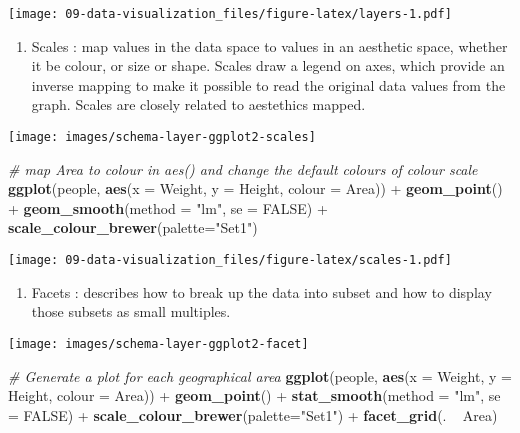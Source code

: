 \documentclass[]{book}
\newenvironment{Shaded}{\begin{snugshade}}{\end{snugshade}}
\newcommand{\KeywordTok}[1]{\textcolor[rgb]{0.13,0.29,0.53}{\textbf{{#1}}}}
\newcommand{\DataTypeTok}[1]{\textcolor[rgb]{0.13,0.29,0.53}{{#1}}}
\newcommand{\StringTok}[1]{\textcolor[rgb]{0.31,0.60,0.02}{{#1}}}
\newcommand{\CommentTok}[1]{\textcolor[rgb]{0.56,0.35,0.01}{\textit{{#1}}}}
\newcommand{\OtherTok}[1]{\textcolor[rgb]{0.56,0.35,0.01}{{#1}}}
\newcommand{\NormalTok}[1]{{#1}}
\providecommand{\tightlist}{%
  \setlength{\itemsep}{0pt}\setlength{\parskip}{0pt}}
\def\tightlist{}
\begin{document}
\texttt{[image: 09-data-visualization\_files/figure-latex/layers-1.pdf]}

\begin{enumerate}
\def\labelenumi{\arabic{enumi}.}
\setcounter{enumi}{3}
\tightlist
\item
   {Scales} : map values in the data space to values in an aesthetic
  space, whether it be colour, or size or shape. Scales draw a legend on
  axes, which provide an inverse mapping to make it possible to read the
  original data values from the graph. Scales are closely related to
  aestethics mapped.
\end{enumerate}

\texttt{[image: images/schema-layer-ggplot2-scales]}

\begin{Shaded}
\begin{Highlighting}[]
\CommentTok{# map Area to colour in aes() and change the default colours of colour scale  }
\KeywordTok{ggplot}\NormalTok{(people, }\KeywordTok{aes}\NormalTok{(}\DataTypeTok{x =} \NormalTok{Weight, }\DataTypeTok{y =} \NormalTok{Height, }\DataTypeTok{colour =} \NormalTok{Area)) +}
\StringTok{  }\KeywordTok{geom_point}\NormalTok{() +}
\StringTok{  }\KeywordTok{geom_smooth}\NormalTok{(}\DataTypeTok{method =} \StringTok{"lm"}\NormalTok{, }\DataTypeTok{se =} \OtherTok{FALSE}\NormalTok{) +}
\StringTok{  }\KeywordTok{scale_colour_brewer}\NormalTok{(}\DataTypeTok{palette=}\StringTok{"Set1"}\NormalTok{)}
\end{Highlighting}
\end{Shaded}

\texttt{[image: 09-data-visualization\_files/figure-latex/scales-1.pdf]}

\begin{enumerate}
\def\labelenumi{\arabic{enumi}.}
\setcounter{enumi}{4}
\tightlist
\item
   {Facets} : describes how to break up the data into subset and how to
  display those subsets as small multiples.
\end{enumerate}

\texttt{[image: images/schema-layer-ggplot2-facet]}

\begin{Shaded}
\begin{Highlighting}[]
\CommentTok{# Generate a plot for each geographical area}
\KeywordTok{ggplot}\NormalTok{(people, }\KeywordTok{aes}\NormalTok{(}\DataTypeTok{x =} \NormalTok{Weight, }\DataTypeTok{y =} \NormalTok{Height, }\DataTypeTok{colour =} \NormalTok{Area)) +}
\StringTok{  }\KeywordTok{geom_point}\NormalTok{() +}
\StringTok{  }\KeywordTok{stat_smooth}\NormalTok{(}\DataTypeTok{method =} \StringTok{"lm"}\NormalTok{, }\DataTypeTok{se =} \OtherTok{FALSE}\NormalTok{) +}\StringTok{ }
\StringTok{  }\KeywordTok{scale_colour_brewer}\NormalTok{(}\DataTypeTok{palette=}\StringTok{"Set1"}\NormalTok{) +}
\StringTok{  }\KeywordTok{facet_grid}\NormalTok{(. ~}\StringTok{ }\NormalTok{Area)}
\end{Highlighting}
\end{Shaded}
\end{document}
